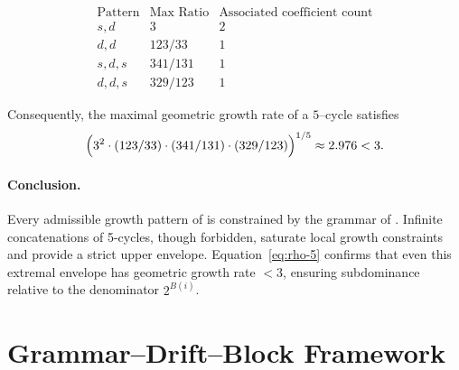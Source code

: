 \documentclass[12pt, oneside]{article}
\numberwithin{equation}{section}
\theoremstyle{definition}
\theoremstyle{plain}
\theoremstyle{remark}
\begin{document}
\[
\begin{array}{c|c|c}
\text{Pattern} & \text{Max Ratio} & \text{Associated coefficient count} \\
\hline
s,d & 3 & 2 \\
d,d & 123/33 & 1 \\
s,d,s & 341/131 & 1 \\
d,d,s & 329/123 & 1
\end{array}
\]

Consequently, the maximal geometric growth rate of a $5$--cycle satisfies
\begin{equation}
\Bigl(
3^2 \cdot (123/33) \cdot (341/131) \cdot (329/123)
\Bigr)^{1/5} 
\approx 2.976 < 3.
\label{eq:rho-5}
\end{equation}

\paragraph{Conclusion.}
Every admissible growth pattern of  is constrained by the grammar
of . Infinite concatenations of 5-cycles, though forbidden, saturate
local growth constraints and provide a strict upper envelope. Equation~\eqref{eq:rho-5}
confirms that even this extremal envelope has geometric growth rate $< 3$, ensuring
subdominance relative to the denominator $2^{B(i)}$.

\newpage
\section{Grammar–Drift–Block Framework}
\label{sec:grammar-drift-block}
\end{document}
